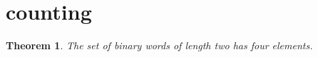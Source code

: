 \documentclass{article}
\newtheorem{theorem}{Theorem}
\begin{document}
\section{counting}

\begin{theorem}\label{thm:RC04}
The set of binary words of length two has four elements.
\end{theorem}
\end{document}
